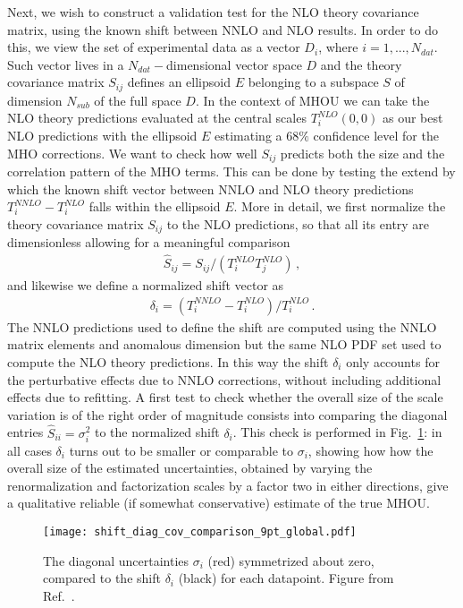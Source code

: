     Next, we wish to construct a validation test for the NLO theory covariance matrix, using the known shift between
    NNLO and NLO results.
    In order to do this, we view the set of experimental data as a vector $D_i$, where $i = 1, ..., N_{dat}$.
    Such vector lives in a $N_{dat}-$dimensional vector space $D$ and
    the theory covariance matrix $S_{ij}$ defines an ellipsoid $E$ belonging to a subspace $S$ of dimension
    $N_{sub}$ of the full space $D$. 
    In the context of MHOU we can take the NLO theory predictions evaluated at the central scales $T_i^{NLO}\left(0,0\right)$
    as our best NLO predictions with the ellipsoid $E$ estimating a $68\%$ confidence level for the MHO corrections. 
    We want to check how well $S_{ij}$ predicts both the size and the correlation pattern
    of the MHO terms. This can be done by testing the extend by which the known shift vector between NNLO and NLO theory predictions
    $T_i^{NNLO} - T_i^{NLO}$
    falls within the ellipsoid $E$.
    More in detail, we first normalize the theory covariance matrix $S_{ij}$ to the NLO predictions, so that all its
    entry are dimensionless allowing for a meaningful comparison 
    \begin{align}
        \hat{S}_{ij} = S_{ij}/\left(T_i^{NLO}T_j^{NLO}\right)\,,
    \end{align}
    and likewise we define a normalized shift vector as
    \begin{align}
        \delta_i = \left(T_i^{NNLO}-T_i^{NLO}\right)/T_i^{NLO}\,.
    \end{align}
    The NNLO predictions used to define the shift are computed using the NNLO matrix elements and anomalous dimension
    but the same NLO PDF set used to compute the NLO theory predictions. In this way the shift $\delta_i$ 
    only accounts for the perturbative effects due to NNLO corrections, without including additional effects
    due to refitting.
    A first test to check whether the overall size of the scale variation is of the right order of magnitude
    consists into comparing the diagonal entries $\hat{S}_{ii} = \sigma_i^2$ to the normalized shift $\delta_i$.
    This check is performed in Fig.~\ref{fig:diag_shift_validation_symmetric}: in all cases 
    $\delta_i$ turns out to be smaller or comparable to $\sigma_i$, showing how how
    the overall size of the estimated uncertainties, obtained by varying the renormalization and factorization scales by
    a factor two in either directions, give a qualitative reliable (if somewhat conservative) estimate of the true MHOU. 
    \begin{figure}[t!]
        \begin{center}
          \texttt{[image: shift\_diag\_cov\_comparison\_9pt\_global.pdf]}
          \caption{\small The diagonal uncertainties  $\sigma_i$ (red)
            symmetrized about zero,
            compared to the shift $\delta_i$ (black) for each
            datapoint. Figure from Ref.~\cite{AbdulKhalek:2019ihb}.}
          \label{fig:diag_shift_validation_symmetric}
        \end{center}
    \end{figure}

